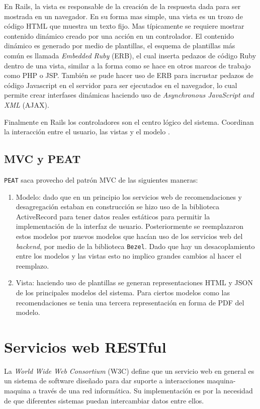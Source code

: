 En Rails, la vista es responsable de la creación de la respuesta dada para
ser mostrada en un navegador. En su forma mas simple, una
vista es un trozo de código HTML que muestra un texto fijo. Mas típicamente
se requiere mostrar contenido dinámico creado por una acción en un controlador.
El contenido dinámico es generado por medio de plantillas, el esquema
de plantillas más común es llamada \textit{Embedded Ruby} (ERB),
el cual inserta pedazos de código Ruby dentro de una vista, similar a la forma
como se hace en otros marcos de trabajo como PHP o JSP. También se pude hacer uso de
ERB para incrustar pedazos de código Javascript en el servidor
para ser ejecutados en el navegador, lo cual permite crear interfases
dinámicas haciendo uso de \textit{Asynchronous JavaScript and XML} (AJAX).

Finalmente en Rails los controladores son el centro lógico del sistema. Coordinan
la interacción entre el usuario, las vistas y el modelo
\cite{15_agile_hansson}.

\subsection{MVC y PEAT}
\texttt{PEAT} saca provecho del patrón MVC de las siguientes maneras:

\begin{enumerate}
\item Modelo: dado que en un principio los servicios web de recomendaciones y
  desagregación estaban en construcción se hizo uso de la biblioteca ActiveRecord
  para tener datos reales estáticos para permitir la implementación
  de la interfaz de usuario. Posteriormente se reemplazaron estos modelos
  por nuevos modelos que hacían uso de los servicios web del \textit{backend},
  por medio de la biblioteca \texttt{Bezel}. Dado que hay un desacoplamiento
  entre los modelos y las vistas esto no implico grandes cambios al hacer el
  reemplazo.
\item Vista: haciendo uso de plantillas se generan representaciones HTML
  y JSON de los principales modelos del sistema. Para ciertos modelos como
  las recomendaciones se tenia una tercera representación en forma de PDF
  del modelo.
\end{enumerate}

\section{Servicios web RESTful}
La \textit{World Wide Web Consortium} (W3C) define que un servicio web
en general es un sistema de software diseñado para dar suporte a interacciones
maquina-maquina a través de una red informática. Su implementación es por la
necesidad de que diferentes sistemas puedan intercambiar datos entre ellos.

